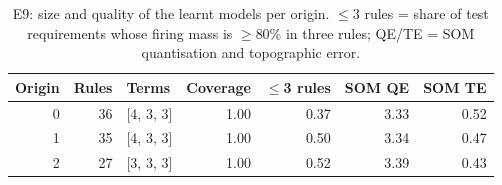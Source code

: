 \begin{table}[t]
\centering
\small
\caption{E9: size and quality of the learnt models per origin. $\le$3 rules = share of test requirements whose firing mass is $\ge$80\% in three rules; QE/TE = SOM quantisation and topographic error.}
\label{tab:e9}
\begin{tabular}{rrlrrrr}
\toprule
Origin & Rules & Terms & Coverage & $\le$3 rules & SOM QE & SOM TE \\
\midrule
0 & 36 & [4, 3, 3] & 1.00 & 0.37 & 3.33 & 0.52 \\
1 & 35 & [4, 3, 3] & 1.00 & 0.50 & 3.34 & 0.47 \\
2 & 27 & [3, 3, 3] & 1.00 & 0.52 & 3.39 & 0.43 \\
\bottomrule
\end{tabular}
\end{table}
